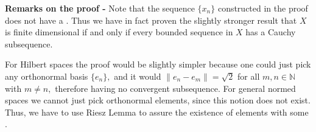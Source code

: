 \documentclass[12pt]{article}
\begin{document}
$\,$

{\bf Remarks on the proof -} Note that the sequence $\{x_n\}$ constructed in the proof does not have a . Thus we have in fact proven the slightly stronger result that $X$ is finite dimensional if and only if every bounded sequence in $X$ has a Cauchy subsequence. 

For Hilbert spaces the proof would be slightly simpler because one could just pick any orthonormal basis $\{e_n\},$ and it would  $\|e_n - e_m\| = \sqrt{2}$ for all $m, n \in \mathbb{N}$ with $m\neq n,$ therefore having no convergent subsequence. For general normed spaces we cannot just pick orthonormal elements, since this notion does not exist. Thus, we have to use Riesz Lemma to assure the existence of elements with some  .
\end{document}
